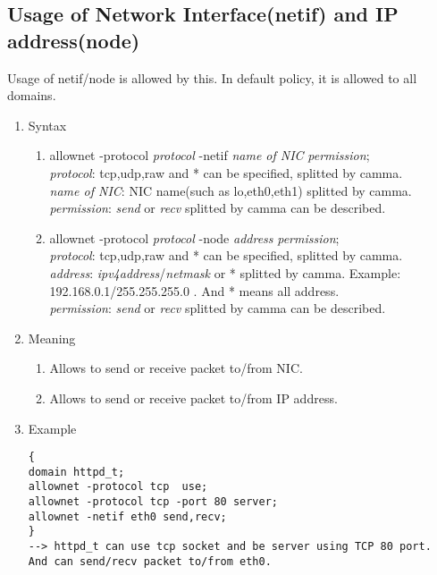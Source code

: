 \documentclass{article}
\begin{document}
\subsection{Usage of Network Interface(netif) and IP address(node)}
Usage of netif/node is allowed by this. In default policy, it is allowed
to all domains.
\begin{enumerate}
 \item Syntax\\
       \begin{enumerate}
	\item allownet -protocol {\it protocol} -netif {\it name of NIC} {\it
	      permission};\\
	      {\it protocol}: tcp,udp,raw and * can be specified, splitted by camma.\\
	      {\it name of NIC}: NIC name(such as lo,eth0,eth1) splitted by camma.\\
	      {\it permission}: {\it send} or {\it recv} splitted by camma can
	      be described.       
	\item allownet -protocol {\it protocol} -node {\it address} {\it
	      permission};\\
	      {\it protocol}: tcp,udp,raw and * can be specified, splitted by camma.\\
	      {\it address}: {\it ipv4address}/{\it netmask} or * splitted by
	      camma. Example: 192.168.0.1/255.255.255.0 . And * means all address.\\
	      {\it permission}: {\it send} or {\it recv} splitted by camma can
	      be described. 
       \end{enumerate}
 \item Meaning\\
       \begin{enumerate}
	\item    Allows to send or receive packet to/from NIC. 
	\item  Allows to send or receive packet to/from IP address. 
       \end{enumerate}
 \item Example\\

\begin{verbatim}
{
domain httpd_t;
allownet -protocol tcp  use;
allownet -protocol tcp -port 80 server;
allownet -netif eth0 send,recv;
}
--> httpd_t can use tcp socket and be server using TCP 80 port.
And can send/recv packet to/from eth0.
\end{verbatim}
\end{enumerate}
\end{document}
